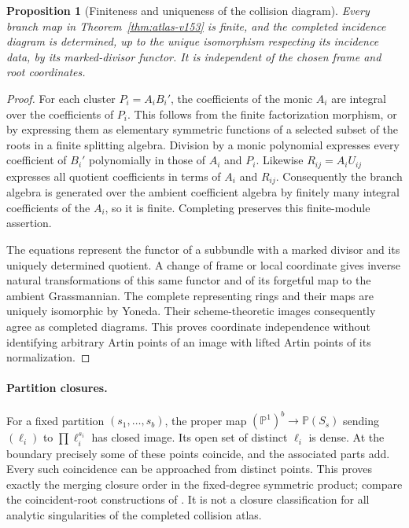 \documentclass[11pt,reqno]{amsart}
\numberwithin{equation}{section}
\newtheorem{proposition}[theorem]{Proposition}
\theoremstyle{definition}\newtheorem{definition}[theorem]{Definition}
\theoremstyle{remark}\newtheorem{remark}[theorem]{Remark}
\newcommand{\Pj}{\mathbb P}\newcommand{\A}{\mathbb A}
\begin{document}
\begin{proposition}[Finiteness and uniqueness of the collision diagram]
\label{prop:atlas-functor-v154}
Every branch map in Theorem~\ref{thm:atlas-v153} is finite, and the
completed incidence diagram is determined, up to the unique
isomorphism respecting its incidence data, by its marked-divisor
functor. It is independent of the chosen frame and root coordinates.
\end{proposition}
\begin{proof}
For each cluster $P_i=A_iB_i'$, the coefficients of the monic $A_i$
are integral over the coefficients of $P_i$. This follows from the
finite factorization morphism, or by expressing them as elementary
symmetric functions of a selected subset of the roots in a finite
splitting algebra. Division by a monic polynomial expresses every
coefficient of $B_i'$ polynomially in those of $A_i$ and $P_i$.
Likewise $R_{ij}=A_iU_{ij}$ expresses all quotient coefficients in
terms of $A_i$ and $R_{ij}$. Consequently the branch algebra is
generated over the ambient coefficient algebra by finitely many
integral coefficients of the $A_i$, so it is finite. Completing
preserves this finite-module assertion.

The equations represent the functor of a subbundle with a marked
divisor and its uniquely determined quotient. A change of frame or
local coordinate gives inverse natural transformations of this same
functor and of its forgetful map to the ambient Grassmannian.
The complete representing rings and their maps are uniquely
isomorphic by Yoneda. Their scheme-theoretic images consequently
agree as completed diagrams. This proves coordinate independence
without identifying arbitrary Artin points of an image with lifted
Artin points of its normalization.
\end{proof}

\paragraph{Partition closures.}
For a fixed partition $(s_1,\ldots,s_b)$, the proper map
$(\Pj^1)^b\to\Pj(S_s)$ sending $(\ell_i)$ to
$\prod\ell_i^{s_i}$ has closed image. Its open set of distinct
$\ell_i$ is dense. At the boundary precisely some of these points
coincide, and the associated parts add. Every such coincidence can
be approached from distinct points. This proves exactly the merging
closure order in the fixed-degree symmetric product; compare the
coincident-root constructions of \cite{Chipalkatti2003,Kurmann2012}.
It is not a closure classification for all analytic singularities
of the completed collision atlas.
\end{document}
